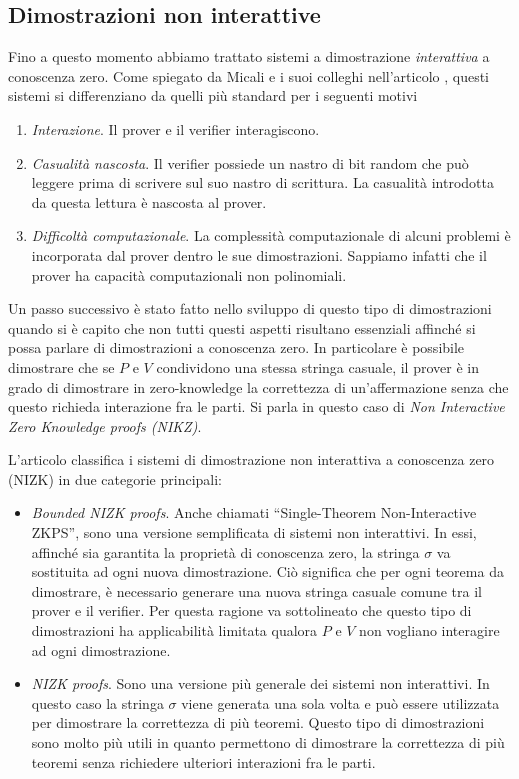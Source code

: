 \documentclass{article}
\theoremstyle{definition}
\begin{document}
\subsection{Dimostrazioni non interattive}
Fino a questo momento abbiamo trattato sistemi a dimostrazione \emph{interattiva} a conoscenza zero.
Come spiegato da Micali e i suoi colleghi nell'articolo \cite{noninteractive}, questi sistemi si differenziano da quelli più standard per i seguenti motivi 
\begin{enumerate}
    \item \emph{Interazione}. Il prover e il verifier interagiscono.
    \item \emph{Casualità nascosta}. Il verifier possiede un nastro di bit random che può leggere prima di scrivere sul suo nastro di scrittura. La casualità introdotta da questa lettura è nascosta al prover.
    \item \emph{Difficoltà computazionale}. La complessità computazionale di alcuni problemi è incorporata dal prover dentro le sue dimostrazioni. Sappiamo infatti che il prover ha capacità computazionali non polinomiali.
\end{enumerate}
Un passo successivo è stato fatto nello sviluppo di questo tipo di dimostrazioni quando si è capito che non tutti questi aspetti risultano essenziali affinché si possa parlare di dimostrazioni a conoscenza zero.
In particolare è possibile dimostrare che se $P$ e $V$ condividono una stessa stringa casuale, il prover è in grado di dimostrare in zero-knowledge la correttezza di un'affermazione senza che questo richieda interazione fra le parti. Si parla in questo caso di \emph{Non Interactive Zero Knowledge proofs (NIKZ)}. 

L'articolo \cite{noninteractive} classifica i sistemi di dimostrazione non interattiva a conoscenza zero (NIZK) in due categorie principali: 
\begin{itemize}
    \item \emph{Bounded NIZK proofs}. Anche chiamati ``Single-Theorem Non-Interactive ZKPS'', sono una versione semplificata di sistemi non interattivi. In essi, affinché sia garantita la proprietà di conoscenza zero, la stringa $\sigma$ va sostituita ad ogni nuova dimostrazione. 
    Ciò significa che per ogni teorema da dimostrare, è necessario generare una nuova stringa casuale comune tra il prover e il verifier.
    Per questa ragione va sottolineato che questo tipo di dimostrazioni ha applicabilità limitata qualora $P$ e $V$ non vogliano interagire ad ogni dimostrazione.
    \item \emph{NIZK proofs}. Sono una versione più generale dei sistemi non interattivi. In questo caso la stringa $\sigma$ viene generata una sola volta e può essere utilizzata per dimostrare la correttezza di più teoremi. Questo tipo di dimostrazioni sono molto più utili in quanto permettono di dimostrare la correttezza di più teoremi senza richiedere ulteriori interazioni fra le parti.
\end{itemize} 
\end{document}
